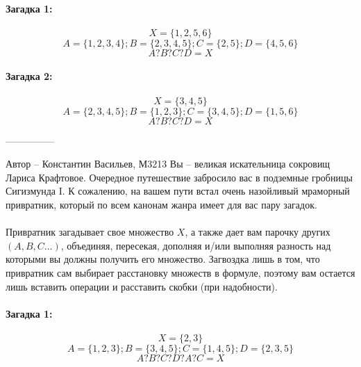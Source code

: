 \documentclass[10pt]{exam}
\begin{document}
\begin{questions}
\paragraph{Загадка 1:}
\begin{equation*}
    X=\{1,2,5,6\}
\end{equation*}
\begin{equation*}
    A=\{1,2,3,4\}; B=\{2,3,4,5\}; C=\{2,5\}; D=\{4,5,6\}
    \end{equation*}
\begin{equation*}
    A ? B ? C ? D = X
\end{equation*}

\paragraph{Загадка 2:}
\begin{equation*}
    X=\{3,4,5\}
\end{equation*}
\begin{equation*}
    A=\{2,3,4,5\}; B=\{1,2,3\}; C=\{3,4,5\}; D=\{1,5,6\}
    \end{equation*}
\begin{equation*}
    A ? B ? C ? D = X
\end{equation*}

---------------

Автор -- Константин Васильев, М3213\question
Вы -- великая искательница сокровищ Лариса Крафтовое. Очередное путешествие забросило вас в подземные гробницы Сигизмунда I. К сожалению, на вашем пути встал очень назойливый мраморный привратник, который по всем канонам жанра имеет для вас пару загадок.
\\
\\
Привратник загадывает свое множество $X$, а также дает вам парочку других $(A,B,C…)$, объединяя, пересекая, дополняя и/или выполняя разность над которыми вы должны получить его множество. Загвоздка лишь в том, что привратник сам выбирает расстановку множеств в формуле, поэтому вам остается лишь вставить операции и расставить скобки (при надобности).

\paragraph{Загадка 1:}
\begin{equation*}
    X=\{2,3\}
\end{equation*}
\begin{equation*}
    A=\{1,2,3\}; B=\{3,4,5\}; C=\{1,4,5\}; D=\{2,3,5\}
    \end{equation*}
\begin{equation*}
    A ? B ? C ? D ? A ? C = X
\end{equation*}


\end{questions}
\end{document}
